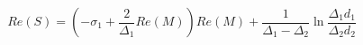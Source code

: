 \begin{equation}
Re(S) = (-\sigma_1 + \frac{2}{\Delta_1}Re(M))Re(M) + 
\frac{1}{\Delta_1 - \Delta_2}
\ln \frac{\Delta_1 d_1}{\Delta_2 d_2}
\end{equation}

